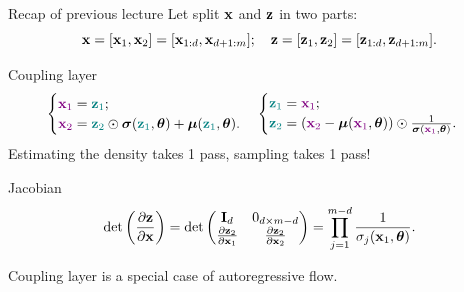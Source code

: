 \begin{frame}{Recap of previous lecture}
	Let split $\mathbf{x}$ and $\mathbf{z}$ in two parts: 
	\[
	\mathbf{x} = [\mathbf{x}_1, \mathbf{x}_2] = [\mathbf{x}_{1:d}, \mathbf{x}_{d+1:m}]; \quad \mathbf{z} = [\mathbf{z}_1, \mathbf{z}_2] = [\mathbf{z}_{1:d}, \mathbf{z}_{d+1:m}].
	\]
	\vspace{-0.5cm}
	\begin{block}{Coupling layer}
		\vspace{-0.5cm}
		\[
		\begin{cases} {\color{violet}\mathbf{x}_1} = {\color{teal}\mathbf{z}_1}; \\ {\color{violet}\mathbf{x}_2} = {\color{teal}\mathbf{z}_2} \odot \boldsymbol{\sigma}({\color{teal}\mathbf{z}_1}, \boldsymbol{\theta}) + \boldsymbol{\mu}({\color{teal}\mathbf{z}_1}, \boldsymbol{\theta}).\end{cases}  
		\begin{cases} {\color{teal}\mathbf{z}_1} ={\color{violet} \mathbf{x}_1}; \\ {\color{teal}\mathbf{z}_2} = \left({\color{violet}\mathbf{x}_2} - \boldsymbol{\mu}({\color{violet}\mathbf{x}_1}, \boldsymbol{\theta}) \right) \odot \frac{1}{\boldsymbol{\sigma}({\color{violet}\mathbf{x}_1}, \boldsymbol{\theta})}.\end{cases}
		\]
		Estimating the density takes 1 pass, sampling takes 1 pass!
	\end{block}
	\begin{block}{Jacobian}
		\vspace{-0.3cm}
		\[
		\det \left( \frac{\partial \mathbf{z}}{\partial \mathbf{x}} \right) = \det 
		\begin{pmatrix}
			\mathbf{I}_d & 0_{d \times m - d} \\
			\frac{\partial \mathbf{z}_2}{\partial \mathbf{x}_1} & \frac{\partial \mathbf{z}_2}{\partial \mathbf{x}_2}
		\end{pmatrix} = \prod_{j=1}^{m - d} \frac{1}{\sigma_j(\mathbf{x}_1, \boldsymbol{\theta})}.
		\]
	\end{block}
	Coupling layer is a special case of autoregressive flow.
	
\end{frame}
